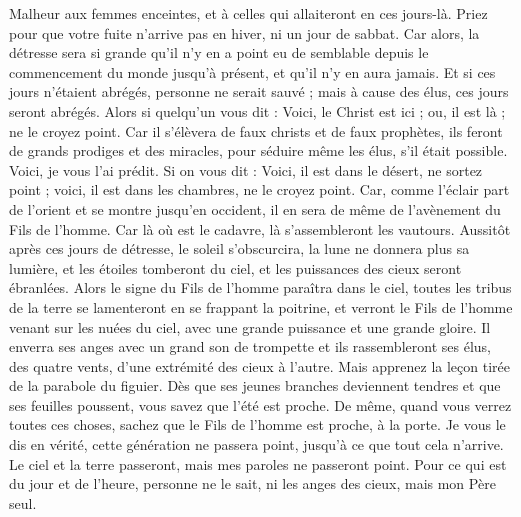 \begin{multicols}{2}
Malheur aux femmes enceintes, et à celles qui allaiteront en ces jours-là.
Priez pour que votre fuite n'arrive pas en hiver, ni un jour de sabbat.
Car alors, la détresse sera si grande qu'il n'y en a point eu de semblable depuis le commencement du monde jusqu'à présent, et qu'il n'y en aura jamais.
Et si ces jours n'étaient abrégés, personne ne serait sauvé ; mais à cause des élus, ces jours seront abrégés.
Alors si quelqu'un vous dit : Voici, le Christ est ici ; ou, il est là ; ne le croyez point.
Car il s'élèvera de faux christs et de faux prophètes, ils feront de grands prodiges et des miracles, pour séduire même les élus, s'il était possible.
Voici, je vous l'ai prédit.
Si on vous dit : Voici, il est dans le désert, ne sortez point ; voici, il est dans les chambres, ne le croyez point.
Car, comme l'éclair part de l'orient et se montre jusqu'en occident, il en sera de même de l'avènement du Fils de l'homme.
Car là où est le cadavre, là s'assembleront les vautours.
Aussitôt après ces jours de détresse, le soleil s'obscurcira, la lune ne donnera plus sa lumière, et les étoiles tomberont du ciel, et les puissances des cieux seront ébranlées.
Alors le signe du Fils de l'homme paraîtra dans le ciel, toutes les tribus de la terre se lamenteront en se frappant la poitrine, et verront le Fils de l'homme venant sur les nuées du ciel, avec une grande puissance et une grande gloire.
Il enverra ses anges avec un grand son de trompette et ils rassembleront ses élus, des quatre vents, d'une extrémité des cieux à l'autre.
Mais apprenez la leçon tirée de la parabole du figuier. Dès que ses jeunes branches deviennent tendres et que ses feuilles poussent, vous savez que l'été est proche.
De même, quand vous verrez toutes ces choses, sachez que le Fils de l'homme est proche, à la porte.
Je vous le dis en vérité, cette génération ne passera point, jusqu'à ce que tout cela n'arrive.
Le ciel et la terre passeront, mais mes paroles ne passeront point.
Pour ce qui est du jour et de l'heure, personne ne le sait, ni les anges des cieux, mais mon Père seul.

\end{multicols}

